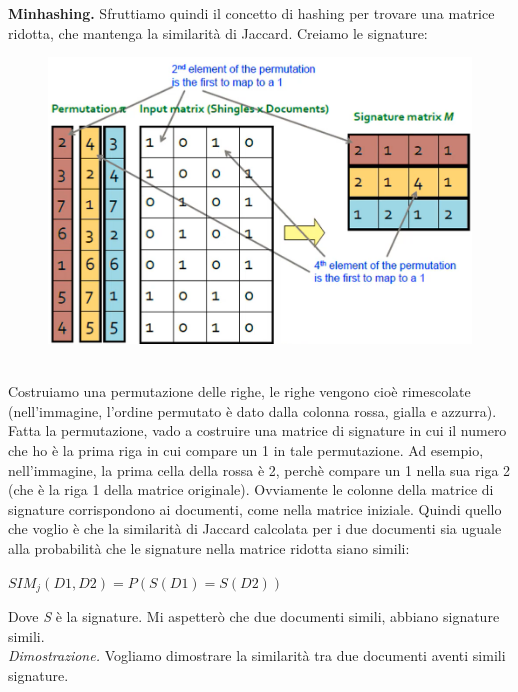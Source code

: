 \textbf{Minhashing.} Sfruttiamo quindi il concetto di hashing per trovare una matrice ridotta, che mantenga la similarità di Jaccard. Creiamo le signature: 
\\
\begin{figure}[th]
    \centering
    \includegraphics[scale=0.5]{FrequentItems/img/minhashing.png}
\end{figure}
\\
Costruiamo una permutazione delle righe, le righe vengono cioè rimescolate (nell'immagine, l'ordine permutato è dato dalla colonna rossa, gialla e azzurra). Fatta la permutazione, vado a costruire una matrice di signature in cui il numero che ho è la prima riga in cui compare un 1 in tale permutazione. Ad esempio, nell'immagine, la prima cella della rossa è 2, perchè compare un 1 nella sua riga 2 (che è la riga 1 della matrice originale). Ovviamente le colonne della matrice di signature corrispondono ai documenti, come nella matrice iniziale. Quindi quello che voglio è che la similarità di Jaccard calcolata per i due documenti sia uguale alla probabilità che le signature nella matrice ridotta siano simili:
\begin{center}
    \begin{math}
        SIM_j(D1,D2) = P(S(D1) = S(D2))  
    \end{math}
\end{center}
Dove \textit{S} è la signature. Mi aspetterò che due documenti simili, abbiano signature simili. 
\\
\textit{Dimostrazione.} Vogliamo dimostrare la similarità tra due documenti aventi simili signature.
\\
